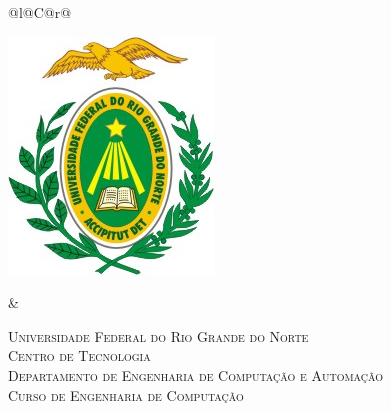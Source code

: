 %
%

\begin{titlepage}

\begin{center}

\small

\begin{tabularx}{\linewidth}{@{}l@{}C@{}r@{}}
\parbox[c]{3cm}{\includegraphics[width=\linewidth]{LogoUFRN}} &
\begin{center}
\textsf{\textsc{Universidade Federal do Rio Grande do Norte\\
Centro de Tecnologia\\
Departamento de Engenharia de Computa\c{c}\~{a}o e Automa\c{c}\~{a}o\\
Curso de Engenharia de Computa\c{c}\~{a}o}}
\end{center}
\end{tabularx}



\end{center}
\end{titlepage}
